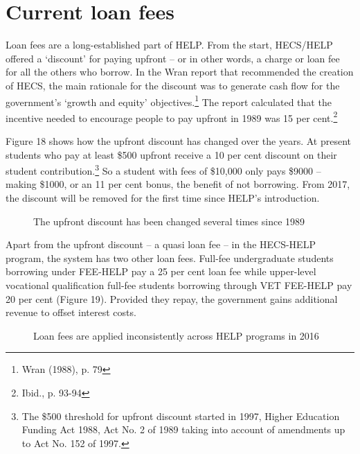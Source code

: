 \documentclass[embargoed]{grattan}
\begin{document}
\section{Current loan fees}\label{sec:current-loan-fees}

Loan fees are a long-established part of HELP. From the start, HECS/HELP offered a `discount' for paying upfront -- or in other words, a charge or loan fee for all the others who borrow. In the Wran report that recommended the creation of HECS, the main rationale for the discount was to generate cash flow for the government's `growth and equity' objectives.\footnote{Wran (1988), p. 79} The report calculated that the incentive needed to encourage people to pay upfront in 1989 was 15 per cent.\footnote{Ibid., p. 93-94}

Figure 18 shows how the upfront discount has changed over the years. At present students who pay at least \$500 upfront receive a 10 per cent discount on their student contribution.\footnote{The \$500 threshold for upfront discount started in 1997, Higher Education Funding Act 1988, Act No. 2 of 1989 taking into account of amendments up to Act No. 152 of 1997.} So a student with fees of \$10,000 only pays \$9000 -- making \$1000, or an 11 per cent bonus, the benefit of not borrowing. From 2017, the discount will be removed for the first time since HELP's introduction.

\begin{figure}
\caption{The upfront discount has been changed several times since 1989}\label{fig:fig18-the-upfront-discount-has-been-changed-several-times-since-1989}


\end{figure}

Apart from the upfront discount -- a quasi loan fee -- in the HECS-HELP program, the system has two other loan fees. Full-fee undergraduate students borrowing under FEE-HELP pay a 25 per cent loan fee while upper-level vocational qualification full-fee students borrowing through VET FEE-HELP pay 20 per cent (Figure 19). Provided they repay, the government gains additional revenue to offset interest costs.

\begin{figure}
\caption{Loan fees are applied inconsistently across HELP programs in 2016}\label{fig:fig19-loan-fees-are-applied-inconsitently-across-HELP-programs-2016}


\end{figure}
\end{document}
